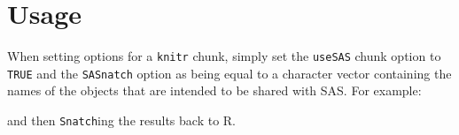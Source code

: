 \documentclass[10pt]{report}
\begin{document}
\section{Usage}
When setting options for a \verb!knitr! chunk, simply set the 
\verb!useSAS! chunk option to \verb!TRUE! and the \verb!SASnatch! 
option as being equal to a character vector containing the names of the objects 
that are intended to be shared with SAS. For example:



and then \verb!Snatch!ing the 
results back to R.
\end{document}
